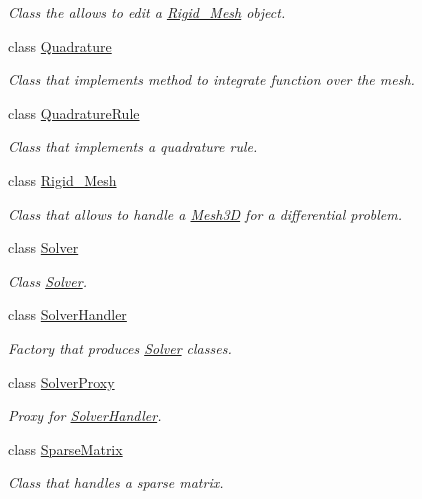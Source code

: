 \begin{DoxyCompactItemize}
\begin{DoxyCompactList}\small\item\em Class the allows to edit a \hyperlink{classFVCode3D_1_1Rigid__Mesh}{Rigid\+\_\+\+Mesh} object. \end{DoxyCompactList}\item 
class \hyperlink{classFVCode3D_1_1Quadrature}{Quadrature}
\begin{DoxyCompactList}\small\item\em Class that implements method to integrate function over the mesh. \end{DoxyCompactList}\item 
class \hyperlink{classFVCode3D_1_1QuadratureRule}{Quadrature\+Rule}
\begin{DoxyCompactList}\small\item\em Class that implements a quadrature rule. \end{DoxyCompactList}\item 
class \hyperlink{classFVCode3D_1_1Rigid__Mesh}{Rigid\+\_\+\+Mesh}
\begin{DoxyCompactList}\small\item\em Class that allows to handle a \hyperlink{classFVCode3D_1_1Mesh3D}{Mesh3D} for a differential problem. \end{DoxyCompactList}\item 
class \hyperlink{classFVCode3D_1_1Solver}{Solver}
\begin{DoxyCompactList}\small\item\em Class \hyperlink{classFVCode3D_1_1Solver}{Solver}. \end{DoxyCompactList}\item 
class \hyperlink{classFVCode3D_1_1SolverHandler}{Solver\+Handler}
\begin{DoxyCompactList}\small\item\em Factory that produces \hyperlink{classFVCode3D_1_1Solver}{Solver} classes. \end{DoxyCompactList}\item 
class \hyperlink{classFVCode3D_1_1SolverProxy}{Solver\+Proxy}
\begin{DoxyCompactList}\small\item\em Proxy for \hyperlink{classFVCode3D_1_1SolverHandler}{Solver\+Handler}. \end{DoxyCompactList}\item 
class \hyperlink{classFVCode3D_1_1SparseMatrix}{Sparse\+Matrix}
\begin{DoxyCompactList}\small\item\em Class that handles a sparse matrix. \end{DoxyCompactList}\item 

\end{DoxyCompactItemize}
